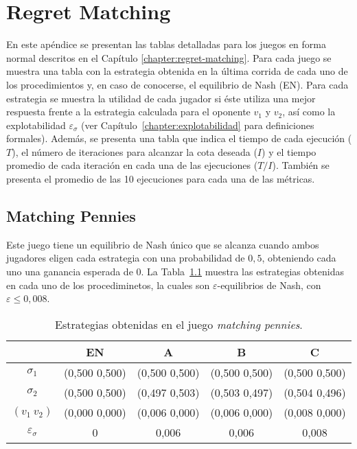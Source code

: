 \chapter{Regret Matching}
\label{apex:chapter:experimentos-rm}

En este apéndice se presentan las tablas detalladas para los juegos en forma normal descritos en el Capítulo \ref{chapter:regret-matching}. Para cada juego se muestra una tabla con la estrategia obtenida en la última corrida de cada uno de los procedimientos y, en caso de conocerse, el equilibrio de Nash (EN). Para cada estrategia se muestra la utilidad de cada jugador si éste utiliza una mejor respuesta frente a la estrategia calculada para el oponente $v_1$ y $v_2$, así como la explotabilidad $\varepsilon_{\sigma}$ (ver Capítulo~\ref{chapter:explotabilidad} para definiciones formales). Además, se presenta una tabla que indica el tiempo de cada ejecución ($T$), el número de iteraciones para alcanzar la cota deseada ($I$) y el tiempo promedio de cada iteración en cada una de las ejecuciones ($T/I$). También se presenta el promedio de las 10 ejecuciones para cada una de las métricas.

\section*{Matching Pennies}

Este juego tiene un equilibrio de Nash único que se alcanza cuando ambos jugadores eligen cada estrategia con una probabilidad de $0,5$, obteniendo cada uno una ganancia esperada de $0$. La Tabla~\ref{tab:estrategias-matching-pennies} muestra las estrategias obtenidas en cada uno de los procediminetos, la cuales son $\varepsilon$-equilibrios de Nash, con $\varepsilon \leq 0,008$.

\begin{table}[h]
    \centering
    \caption{Estrategias obtenidas en el juego \textit{matching pennies}.}
    \label{tab:estrategias-matching-pennies}
    \begin{tabular}{c c c c c}
    \toprule
        & EN & A & B & C \\ \midrule
        $\sigma_1$   & (0,500 0,500) & (0,500 0,500) & (0,500 0,500) & (0,500 0,500) \\
        $\sigma_2$   & (0,500 0,500) & (0,497 0,503) & (0,503 0,497) & (0,504 0,496) \\ 
        $(v_1\  v_2)$ & (0,000 0,000) & (0,006 0,000) & (0,006 0,000) & (0,008 0,000) \\
        $\varepsilon_{\sigma}$ & 0 & 0,006 & 0,006 & 0,008 \\ \bottomrule
    \end{tabular}
\end{table}

